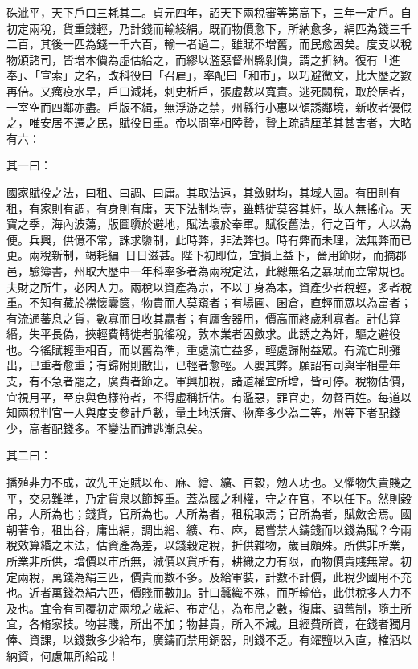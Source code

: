 \begin{pinyinscope}
 硃泚平，天下戶口三耗其二。貞元四年，詔天下兩稅審等第高下，三年一定戶。自初定兩稅，貨重錢輕，乃計錢而輸綾絹。既而物價愈下，所納愈多，絹匹為錢三千二百，其後一匹為錢一千六百，輸一者過二，雖賦不增舊，而民愈困矣。度支以稅物頒諸司，皆增本價為虛估給之，而繆以濫惡督州縣剝價，謂之折納。復有「進奉」、「宣索」之名，改科役曰「召雇」，率配曰「和市」，以巧避微文，比大歷之數再倍。又癘疫水旱，戶口減耗，刺史析戶，張虛數以寬責。逃死闕稅，取於居者，一室空而四鄰亦盡。戶版不緝，無浮游之禁，州縣行小惠以傾誘鄰境，新收者優假之，唯安居不遷之民，賦役日重。帝以問宰相陸贄，贄上疏請厘革其甚害者，大略有六：



 其一曰：



 國家賦役之法，曰租、曰調、曰庸。其取法遠，其斂財均，其域人固。有田則有租，有家則有調，有身則有庸，天下法制均壹，雖轉徙莫容其奸，故人無搖心。天寶之季，海內波蕩，版圖隳於避地，賦法壞於奉軍。賦役舊法，行之百年，人以為便。兵興，供億不常，誅求隳制，此時弊，非法弊也。時有弊而未理，法無弊而已更。兩稅新制，竭耗編，日日滋甚。陛下初即位，宜損上益下，嗇用節財，而摘郡邑，驗簿書，州取大歷中一年科率多者為兩稅定法，此總無名之暴賦而立常規也。夫財之所生，必因人力。兩稅以資產為宗，不以丁身為本，資產少者稅輕，多者稅重。不知有藏於襟懷囊篋，物貴而人莫窺者；有場圃、囷倉，直輕而眾以為富者；有流通蕃息之貨，數寡而日收其贏者；有廬舍器用，價高而終歲利寡者。計估算緡，失平長偽，挾輕費轉徙者脫徭稅，敦本業者困斂求。此誘之為奸，驅之避役也。今徭賦輕重相百，而以舊為準，重處流亡益多，輕處歸附益眾。有流亡則攤出，已重者愈重；有歸附則散出，已輕者愈輕。人嬰其弊。願詔有司與宰相量年支，有不急者罷之，廣費者節之。軍興加稅，諸道權宜所增，皆可停。稅物估價，宜視月平，至京與色樣符者，不得虛稱折估。有濫惡，罪官吏，勿督百姓。每道以知兩稅判官一人與度支參計戶數，量土地沃瘠、物產多少為二等，州等下者配錢少，高者配錢多。不變法而逋逃漸息矣。



 其二曰：



 播殖非力不成，故先王定賦以布、麻、繒、纊、百穀，勉人功也。又懼物失貴賤之平，交易難準，乃定貨泉以節輕重。蓋為國之利權，守之在官，不以任下。然則穀帛，人所為也；錢貨，官所為也。人所為者，租稅取焉；官所為者，賦斂舍焉。國朝著令，租出谷，庸出絹，調出繒、纊、布、麻，曷嘗禁人鑄錢而以錢為賦？今兩稅效算緡之末法，估資產為差，以錢穀定稅，折供雜物，歲目頗殊。所供非所業，所業非所供，增價以市所無，減價以貨所有，耕織之力有限，而物價貴賤無常。初定兩稅，萬錢為絹三匹，價貴而數不多。及給軍裝，計數不計價，此稅少國用不充也。近者萬錢為絹六匹，價賤而數加。計口蠶織不殊，而所輸倍，此供稅多人力不及也。宜令有司覆初定兩稅之歲絹、布定估，為布帛之數，復庸、調舊制，隨土所宜，各脩家技。物甚賤，所出不加；物甚貴，所入不減。且經費所資，在錢者獨月俸、資課，以錢數多少給布，廣鑄而禁用銅器，則錢不乏。有糴鹽以入直，榷酒以納資，何慮無所給哉！




\end{pinyinscope}
